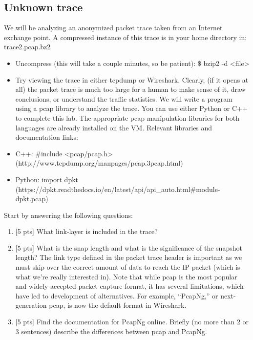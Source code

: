 \subsection{Unknown trace}
We will be analyzing an anonymized packet trace taken from an Internet exchange point.  A compressed instance of this trace is
in your home directory in: trace2.pcap.bz2
\begin{itemize}
\item Uncompress (this will take a couple minutes, so be patient): \$ bzip2 -d <file>
\item Try viewing the trace in either tcpdump or Wireshark.
Clearly, (if it opens at all) the packet trace is much too large for a human to make sense of it, draw conclusions, or understand the traffic statistics. We will write a program using a pcap library to analyze the trace. You can use either Python or C++ to complete this lab. The appropriate pcap manipulation libraries for both languages are already installed on the VM.
Relevant libraries and documentation links:
\item C++: \#include <pcap/pcap.h> (http://www.tcpdump.org/manpages/pcap.3pcap.html)
\item Python: import dpkt (https://dpkt.readthedocs.io/en/latest/api/api\_auto.html\#module-dpkt.pcap)
\end{itemize}

Start by answering the following questions:
\begin{enumerate}
\item{[5 pts]} What link-layer is included in the trace?
\item {[5 pts]} What is the snap length and what is the significance of the snapshot length?
The link type defined in the packet trace header is important as we must skip over the correct amount of data to reach the IP packet (which is what we’re really interested in).
Note that while pcap is the most popular and widely accepted packet capture format, it has several limitations, which have led to development of
alternatives. For example, “PcapNg,” or next-generation pcap, is now the default format in Wireshark.
\item {[5 pts]} Find the documentation for PcapNg online. Briefly (no more than 2 or 3 sentences) describe the differences between pcap and PcapNg.
\end{enumerate}

